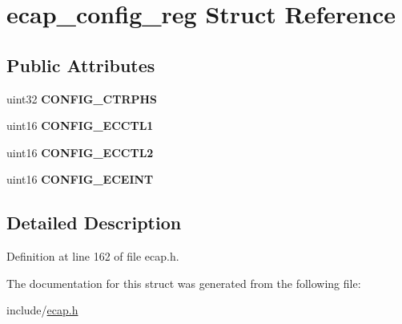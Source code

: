 \hypertarget{structecap__config__reg}{}\section{ecap\+\_\+config\+\_\+reg Struct Reference}
\label{structecap__config__reg}
\subsection*{Public Attributes}
\begin{DoxyCompactItemize}
\item 
\mbox{\label{structecap__config__reg_acbdf7c2066fcf244e6178286c8ebabd3}} 
uint32 {\bfseries C\+O\+N\+F\+I\+G\+\_\+\+C\+T\+R\+P\+HS}
\item 
\mbox{\label{structecap__config__reg_a1046a74da16c1830f17163a98d0b596b}} 
uint16 {\bfseries C\+O\+N\+F\+I\+G\+\_\+\+E\+C\+C\+T\+L1}
\item 
\mbox{\label{structecap__config__reg_a3b5a197e1572a5f51ab0b8e7c58ddee4}} 
uint16 {\bfseries C\+O\+N\+F\+I\+G\+\_\+\+E\+C\+C\+T\+L2}
\item 
\mbox{\label{structecap__config__reg_ab69b2e5e691df4c67044271d0a794fbf}} 
uint16 {\bfseries C\+O\+N\+F\+I\+G\+\_\+\+E\+C\+E\+I\+NT}
\end{DoxyCompactItemize}


\subsection{Detailed Description}


Definition at line 162 of file ecap.\+h.



The documentation for this struct was generated from the following file\+:\begin{DoxyCompactItemize}
\item 
include/\mbox{\hyperlink{ecap_8h}{ecap.\+h}}\end{DoxyCompactItemize}
